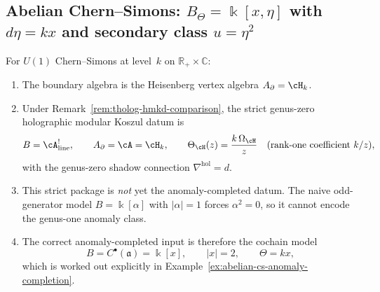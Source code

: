 \subsection{Abelian Chern--Simons: $B_\Theta = \Bbbk[x,\eta]$ with
$d\eta = kx$ and secondary class $u = \eta^2$}
\label{subsec:abelian-cs-example}

\begin{computation}
\label{comp:abelian-cs-strict-datum}
For $U(1)$ Chern--Simons at level~$k$ on
$\mathbb R_+\times\mathbb C$:
\begin{enumerate}[label=\textup{(\roman*)}]
\item The boundary algebra is the Heisenberg vertex algebra
 $A_\partial=\cH_k$.
\item Under Remark~\ref{rem:tholog-hmkd-comparison}, the strict
 genus-zero holographic modular Koszul datum is
 \[
 B=\cA^!_{\mathrm{line}},
 \qquad
 A_\partial=\cA=\cH_k,
 \qquad
 \Theta_{\cH}(z)=\frac{k\,\Omega_{\cH}}{z}
 \quad(\text{rank-one coefficient }k/z),
 \]
 with the genus-zero shadow connection
 $\nabla^{\mathrm{hol}}=d$.
\item This strict package is \emph{not} yet the anomaly-completed
 datum. The naive odd-generator model
 $B=\Bbbk[\alpha]$ with $|\alpha|=1$ forces
 $\alpha^2=0$, so it cannot encode the genus-one anomaly class.
\item The correct anomaly-completed input is therefore the cochain
 model
 \[
 B=C^\bullet(\mathfrak a)=\Bbbk[x],
 \qquad
 |x|=2,
 \qquad
 \Theta=kx,
 \]
 which is worked out explicitly in
 Example~\ref{ex:abelian-cs-anomaly-completion}.
\end{enumerate}
\end{computation}

